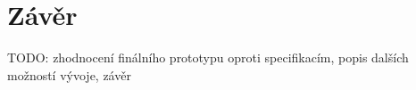 \chapter*{Závěr}
\label{chap:zaver}
TODO: zhodnocení finálního prototypu oproti specifikacím, popis dalších možností vývoje, závěr
